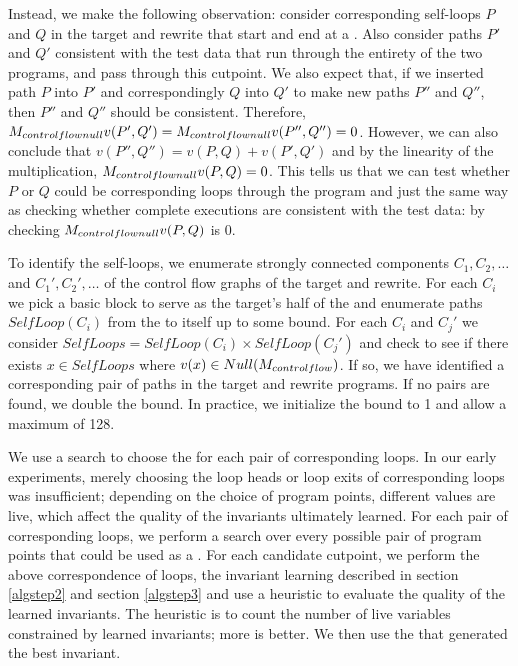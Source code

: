 Instead, we make the following observation: consider corresponding
self-loops $P$ and $Q$ in the target and rewrite that start and end
at a \cutpoint. Also consider paths $P'$ and $Q'$ consistent with
the test data that run through the entirety of the two programs,
and pass through this cutpoint. We also expect that, if we inserted
path $P$ into $P'$ and correspondingly $Q$ into $Q'$ to make new
paths $P''$ and $Q''$, then $P''$ and $Q''$ should be consistent.
Therefore, $M_{controlflownull} v(P',Q') = M_{controlflownull}
v(P'',Q'') = 0$. However, we can also conclude that $v(P'',Q'')
= v(P,Q) + v(P',Q')$ and by the linearity of the multiplication,
$M_{controlflownull} v(P,Q) = 0$. This tells us that we can test
whether $P$ or $Q$ could be corresponding loops through the program
and just the same way as checking whether complete executions are
consistent with the test data: by checking $M_{controlflownull}
v(P,Q)$ is 0.  

To identify the self-loops, we enumerate strongly connected components
$C_1, C_2, \dotsc$ and $C_1', C_2', \dotsc$ of the control flow graphs
of the target and rewrite. For each $C_i$ we pick a basic block to
serve as the target's half of the \cutpoint{} and enumerate paths
$SelfLoop(C_i)$ from the \cutpoint{} to itself up to some bound.
For each $C_i$ and $C_j'$ we consider $SelfLoops = SelfLoop(C_i)
\times SelfLoop(C_j')$ and check to see if there exists $x \in
SelfLoops$ where $v(x) \in Null(M_{controlflow})$. If so, we
have identified a corresponding pair of paths in the target and
rewrite programs. If no pairs are found, we double the bound. In
practice, we initialize the bound to 1 and allow a maximum of 128.

We use a search to choose the \cutpoint{} for each pair of
corresponding loops. In our early experiments, merely choosing the
loop heads or loop exits of corresponding loops was insufficient;
depending on the choice of program points, different values are live,
which affect the quality of the invariants ultimately learned. For
each pair of corresponding loops, we perform a search over every
possible pair of program points that could be used as a \cutpoint.
For each candidate cutpoint, we perform the above correspondence of
loops, the invariant learning described in section \ref{algstep2} and
section \ref{algstep3} and use a heuristic to evaluate the quality of
the learned invariants. The heuristic is to count the number of live
variables constrained by learned invariants; more is better. We then
use the \cutpoint{} that generated the best invariant.

